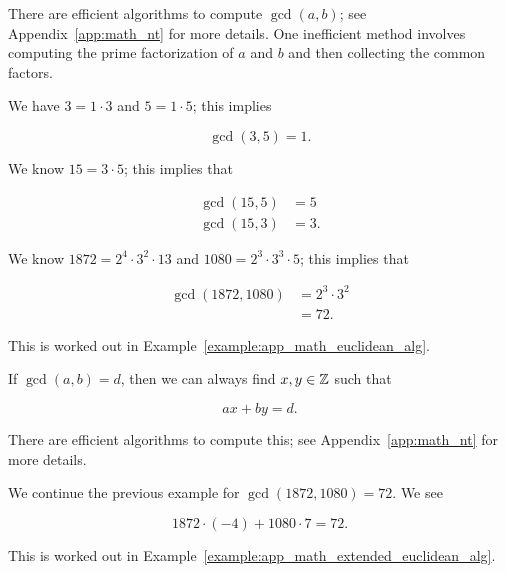 There are efficient algorithms to compute $\gcd(a,b)$;
see Appendix~\ref{app:math_nt} for more details.
One inefficient method involves computing the prime factorization
of $a$ and $b$ and then collecting the common factors.

\begin{example}
\label{example:bnt_gcd}

We have $3 = 1\cdot3$ and $5 = 1\cdot5$;
this implies

\begin{equation}
    \gcd(3,5) = 1.
\end{equation}

\noindent
We know $15 = 3\cdot 5$;
this implies that

\begin{align}
    \gcd(15,5) &= 5 \nonumber\\
    \gcd(15,3) &= 3.
\end{align}

\noindent
We know $1872 = 2^{4}\cdot3^{2}\cdot13$ and
$1080 = 2^{3}\cdot3^{3}\cdot5$;
this implies that

\begin{align}
    \gcd(1872, 1080) &= 2^{3}\cdot3^{2} \nonumber\\
        &= 72.
\end{align}

\noindent
This is worked out in
Example~\ref{example:app_math_euclidean_alg}.
\end{example}

If $\gcd(a,b) = d$, then we can always find $x,y\in\mathbb{Z}$ such that

\begin{equation}
    ax + by = d.
\end{equation}

\noindent
There are efficient algorithms to compute this;
see Appendix~\ref{app:math_nt} for more details.

\begin{example}
\label{example:bnt_extended_gcd}

We continue the previous example for $\gcd(1872, 1080) = 72$.
We see

\begin{equation}
    1872 \cdot (-4) + 1080 \cdot 7 = 72.
\end{equation}

\noindent
This is worked out in
Example~\ref{example:app_math_extended_euclidean_alg}.
\end{example}

